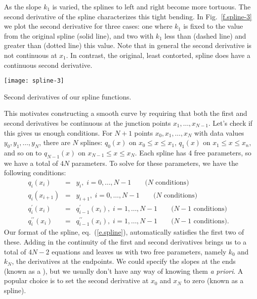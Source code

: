 As the slope $k_{1}$ is varied, the splines to left and right become more tortuous. The second derivative of the spline characterizes this tight bending. In Fig.~\ref{f.spline-3} we plot the second derivative for three cases: one where $k_{1}$ is fixed to the value from the original spline (solid line), and two with $k_{1}$ less than (dashed line) and greater than (dotted line) this value. Note that in general the second derivative is not continuous at $x_{1}$. In contrast, the original, least contorted, spline does have a continuous second derivative.
\begin{marginfigure}
\texttt{[image: spline-3]}
\caption{\label{f.spline-3} Second derivatives of our spline functions.}
\end{marginfigure}

This motivates constructing a smooth curve by requiring that both the first and second derivatives be continuous at the junction points $x_{1},\ldots,x_{N-1}$. Let's check if this gives us enough conditions. For $N+1$ points $x_{0},x_{1},\ldots,x_{N}$ with data values $y_{0},y_{1},\ldots,y_{N}$, there are $N$ splines: $q_{0}(x)$ on $x_{0}\le x\le x_{1}$, $q_{1}(x)$ on $x_{1}\le x \le x_{n}$, and so on to $q_{N-1}(x)$ on $x_{N-1}\le x\le x_{N}$. Each spline has 4 free parameters, so we have a total of $4N$ parameters. To solve for these parameters, we have the following conditions:
\begin{eqnarray*}
q_{i}(x_{i}) &=& y_{i},\;i=0,\ldots,N-1\qquad\textrm{($N$ conditions)}\\
q_{i}(x_{i+1}) &=& y_{i+1},\;i=0,\ldots,N-1\qquad\textrm{($N$ conditions)}\\
q^{\prime}_{i}(x_{i}) &=& q^{\prime}_{i-1}(x_{i}),\;i=1,\ldots,N-1\qquad\textrm{($N-1$ conditions)}\\
q^{\prime\prime}_{i}(x_{i}) &=& q^{\prime\prime}_{i-1}(x_{i}),\;i=1,\ldots,N-1\qquad\textrm{($N-1$ conditions)}.
\end{eqnarray*}
Our format of the spline, eq.~(\ref{e.spline}), automatically satisfies the first two of these. Adding in the continuity of the first and second derivatives brings us to a total of $4N-2$ equations and leaves us with two free parameters, namely $k_{0}$ and $k_{N}$, the derivatives at the endpoints. We could specify the slopes at the ends (known as a ), but we usually don't have any way of knowing them \emph{a priori}. A popular choice is to set the second derivative at $x_{0}$ and $x_{N}$ to zero (known as a  spline).

